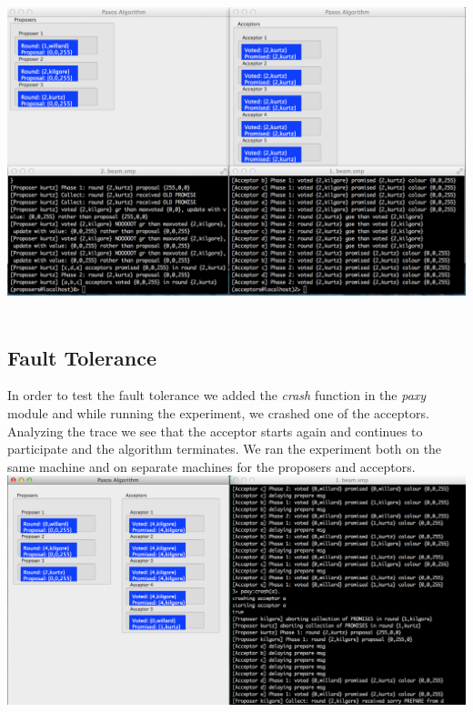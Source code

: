 \documentclass[a4paper, 11pt]{article}
\begin{document}
\includegraphics[scale=0.30]{images/exp9.png} \\\\
\newpage

\subsection{Fault Tolerance}

In order to test the fault tolerance we added the \textit{crash} function in the \textit{paxy} module and while running the experiment, we crashed one of the acceptors. Analyzing the trace we see that the acceptor starts again and continues to participate and the algorithm terminates. We ran the experiment both on the same machine and on separate machines for the proposers and acceptors.\\

\includegraphics[scale=0.35]{images/exp10.png} \\\\
\end{document}
